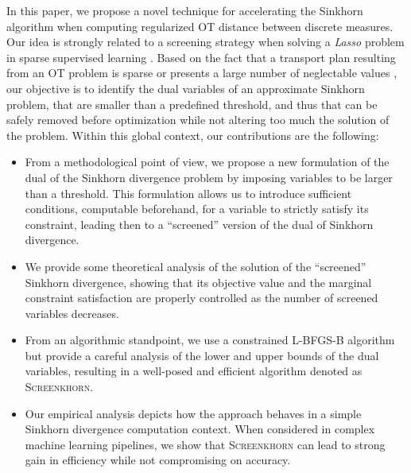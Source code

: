 {In this paper, we propose a novel technique for accelerating the Sinkhorn algorithm when computing regularized OT distance between discrete measures. Our idea
is strongly related to a screening strategy when solving a \emph{Lasso}
problem in sparse supervised learning \citep{Ghaoui2010SafeFE}. Based on the fact
that a  transport plan resulting from an OT problem is sparse or presents a large
number of neglectable values \citep{blondel2018ICML}, our objective is to identify the  dual variables of an approximate Sinkhorn problem, that are smaller than a predefined threshold, and thus that can be safely removed before optimization while not altering too much the solution of the problem.  
Within this global context, our contributions are the following:
\begin{itemize}
	  \setlength\itemsep{-0.1cm}
	
	\item From a methodological point of view, we propose a new formulation of the dual of the Sinkhorn divergence problem by imposing variables to be larger than a threshold.
	This formulation allows us to introduce sufficient conditions, computable beforehand, for a variable to  strictly satisfy its constraint, leading then to
	a ``screened'' version of the dual of Sinkhorn divergence. 
	\item We provide some theoretical analysis of the solution of the ``screened''  Sinkhorn divergence, showing that its objective value and the marginal constraint satisfaction are properly controlled 	as the number of screened variables decreases.
	\item From an algorithmic standpoint, we use a constrained L-BFGS-B algorithm \citep{nocedal1980,byrd1995L-BFGS-B} but provide a careful analysis of the lower and upper bounds of the dual	variables, resulting in a well-posed and efficient algorithm denoted as \textsc{Screenkhorn}.
	\item Our empirical analysis depicts how the approach behaves in a simple Sinkhorn divergence computation context. When considered in  complex machine learning
	pipelines, we show that \textsc{Screenkhorn} can lead to strong gain in efficiency
	while not compromising on accuracy.
\end{itemize}}
%	
%

